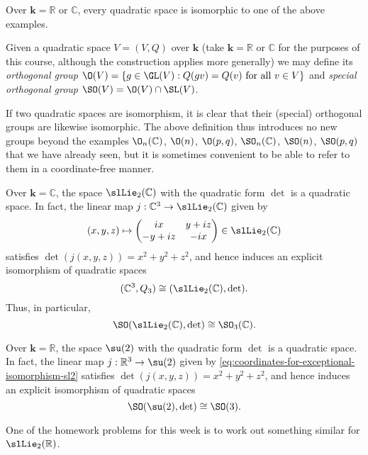 \documentclass[reqno]{amsart} 
\begin{document}
\begin{theorem}
  Over $\mathbf{k} = \mathbb{R}$ or $\mathbb{C}$,
  every quadratic space is isomorphic to one of the above examples.
\end{theorem}
\begin{definition}
  Given a quadratic space $V = (V,Q)$ over $\mathbf{k}$ (take
  $\mathbf{k} = \mathbb{R}$ or $\mathbb{C}$ for the purposes
  of this course, although the construction applies more generally)
  we may define its \emph{orthogonal group}
  $\O(V) = \{g \in \GL(V) : Q(g v) = Q(v) \text{ for all } v \in
  V\}$
  and \emph{special orthogonal group}
  $\SO(V) = \O(V) \cap \SL(V)$.
\end{definition}
If two quadratic spaces are isomorphism, it is clear that their
(special)
orthogonal groups are likewise isomorphic.
The above  definition thus introduces
no new groups beyond
the examples
$\O_n(\mathbb{C})$, $\O(n)$, $\O(p,q)$,
$\SO_n(\mathbb{C})$, $\SO(n)$, $\SO(p,q)$
that we have already seen, 
but it is sometimes convenient to be able to refer
to them in a coordinate-free manner.

\begin{example}
  Over $\mathbf{k} = \mathbb{C}$,
  the space $\slLie_2(\mathbb{C})$
  with the quadratic form $\det$ is a quadratic space.
  In fact, the linear map
  $j : \mathbb{C}^3 \rightarrow \slLie_2(\mathbb{C})$
  given by
  \begin{equation}\label{eq:coordinates-for-exceptional-isomorphism-sl2}
        (x,y,z)
    \mapsto 
\begin{pmatrix}
      i x & y + i z \\
      -y + i z & -i x
    \end{pmatrix}
    \in \slLie_2(\mathbb{C})
  \end{equation}
  satisfies $\det(j(x,y,z)) = x^2 + y^2 + z^2$,
  and hence induces an explicit isomorphism of quadratic spaces
  \begin{equation*}
    (\mathbb{C}^3, Q_3)
    \cong (\slLie_2(\mathbb{C}),\det).
  \end{equation*}
  Thus, in particular,
  \begin{equation*}
    \SO(\slLie_2(\mathbb{C}),\det) \cong \SO_3(\mathbb{C}).
  \end{equation*}
\end{example}
\begin{example}
  Over $\mathbf{k} = \mathbb{R}$,
  the space $\su(2)$
  with the quadratic form $\det$ is a quadratic space.
  In fact, the linear map
  $j : \mathbb{R}^3 \rightarrow \su(2)$
  given by \eqref{eq:coordinates-for-exceptional-isomorphism-sl2}
  satisfies $\det(j(x,y,z)) = x^2 + y^2 + z^2$,
  and hence induces an explicit isomorphism of quadratic spaces
  \begin{equation*}
    \SO(\su(2),\det) \cong \SO(3).
  \end{equation*}
\end{example}
One of the homework problems
for this week is to work out something similar
for $\slLie_2(\mathbb{R})$.
\end{document}
